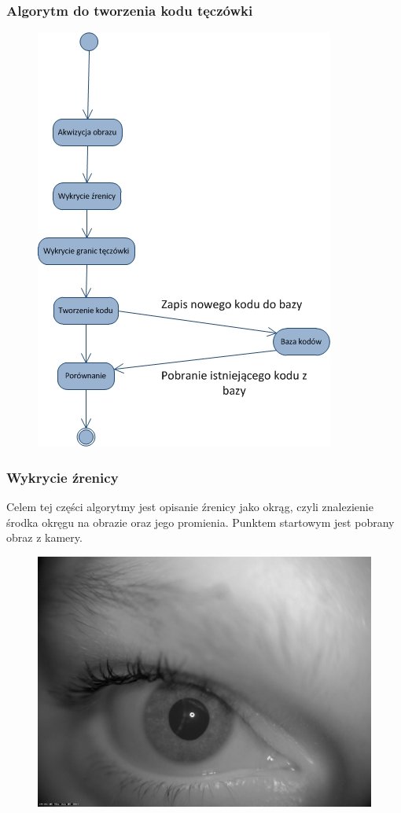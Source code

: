 \documentclass{beamer}
\begin{document}
\begin{frame}
\frametitle{Algorytm do tworzenia kodu tęczówki}
\begin{figure}
\begin{center}
\includegraphics[scale=0.4]{schemat.jpg}
\end{center}
\end{figure}
\end{frame}


\begin{frame}
\frametitle{Wykrycie źrenicy}
Celem tej części algorytmy jest opisanie źrenicy jako okrąg, czyli znalezienie środka okręgu na obrazie oraz jego promienia. Punktem startowym jest pobrany obraz z kamery.
\begin{figure}
\begin{center}
\includegraphics[scale=0.13]{szarosc.jpg}
\end{center}
\end{figure}
\end{frame}
\end{document}
